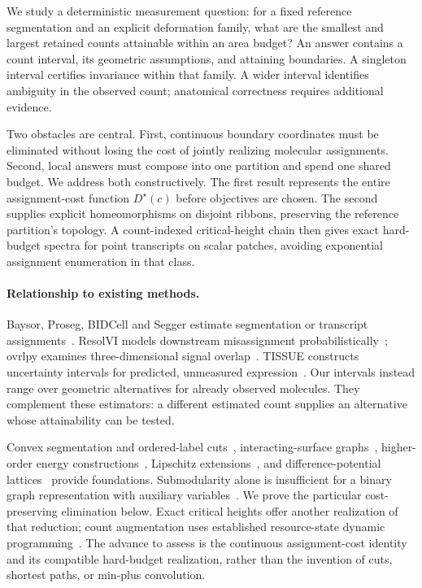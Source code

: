 \documentclass[10pt,letterpaper]{article}
\begin{document}
We study a deterministic measurement question: for a fixed reference segmentation and an explicit deformation family, what are the smallest and largest retained counts attainable within an area budget? An answer contains a count interval, its geometric assumptions, and attaining boundaries. A singleton interval certifies invariance within that family. A wider interval identifies ambiguity in the observed count; anatomical correctness requires additional evidence.

Two obstacles are central. First, continuous boundary coordinates must be eliminated without losing the cost of jointly realizing molecular assignments. Second, local answers must compose into one partition and spend one shared budget. We address both constructively. The first result represents the entire assignment-cost function $D^\star(c)$ before objectives are chosen. The second supplies explicit homeomorphisms on disjoint ribbons, preserving the reference partition's topology. A count-indexed critical-height chain then gives exact hard-budget spectra for point transcripts on scalar patches, avoiding exponential assignment enumeration in that class.

\paragraph{Relationship to existing methods.}
Baysor, Proseg, BIDCell and Segger estimate segmentation or transcript assignments~\cite{baysor,proseg,bidcell,segger}. ResolVI models downstream misassignment probabilistically~\cite{resolvi}; ovrlpy examines three-dimensional signal overlap~\cite{ovrlpy}. TISSUE constructs uncertainty intervals for predicted, unmeasured expression~\cite{tissue}. Our intervals instead range over geometric alternatives for already observed molecules. They complement these estimators: a different estimated count supplies an alternative whose attainability can be tested.

Convex segmentation and ordered-label cuts~\cite{hochbaum,ishikawa}, interacting-surface graphs~\cite{li,shah}, higher-order energy constructions~\cite{kz,kohli}, Lipschitz extensions~\cite{petrakis}, and difference-potential lattices~\cite{felsner} provide foundations. Submodularity alone is insufficient for a binary graph representation with auxiliary variables~\cite{zivny}. We prove the particular cost-preserving elimination below. Exact critical heights offer another realization of that reduction; count augmentation uses established resource-state dynamic programming~\cite{hassin}. The advance to assess is the continuous assignment-cost identity and its compatible hard-budget realization, rather than the invention of cuts, shortest paths, or min-plus convolution.
\end{document}
